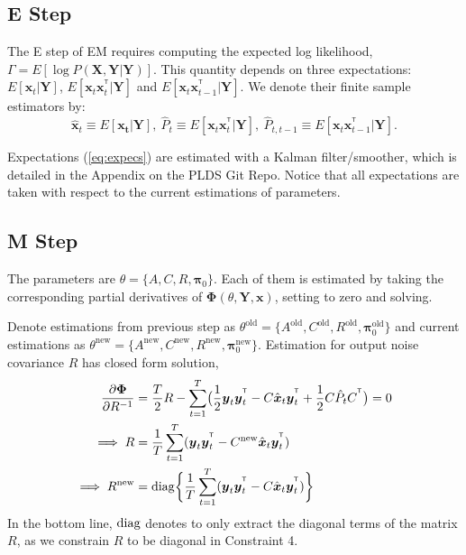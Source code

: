 \documentclass[fleqn,12pt]{article}
\let\oldref\ref
\renewcommand{\ref}[1]{(\oldref{#1})}
\newcommand{\T}{^{\ensuremath{\mathsf{T}}}}           %
\newcommand{\diag}{\operatornamewithlimits{diag}}
\providecommand{\mb}[1]{\boldsymbol{#1}}
\newcommand{\bx}{\mb{x}}
\newcommand{\by}{\mb{y}}
\newcommand{\bX}{\mb{X}}
\newcommand{\bY}{\mb{Y}}
\begin{document}
\subsection{E Step}
The E step of EM requires computing the expected log likelihood, $\Gamma = E[\log P(\bX,\bY|\bY)]$. This quantity depends on three expectations: $E[\bx_t|\bY]$, $E[\bx_t\bx_t^{\T}|\bY]$ and $E[\bx_t\bx_{t-1}^{\T}|\bY]$. We denote their finite sample estimators by:
\begin{equation}\label{eq:expecs}
\hat{\bx}_t \equiv E[\mathbf{x_t}|\bY],\  \hat{P}_t  \equiv E[\bx_t\bx_t^{\T}|\bY],\  \hat{P}_{t,t-1}  \equiv E[\bx_t\bx_{t-1}^{\T}|\bY].
\end{equation}

Expectations \ref{eq:expecs} are estimated with a Kalman filter/smoother, which is detailed in the Appendix on the PLDS Git Repo. Notice that all expectations are taken with respect to the current estimations of parameters.
\subsection{M Step}
The parameters are $\theta =\{A,C,R,\mathbf{\pi}_0\}$. Each of them is estimated by taking the corresponding partial derivatives of $\mathbf{\Phi}(\theta,\bY,\bx)$, setting to zero and solving.

Denote estimations from previous step as $\theta^{\text{old}} =\{A^{\text{old}},C^{\text{old}},R^{\text{old}},\mathbf{\pi}_0^{\text{old}}\}$ and current estimations as $\theta^{\text{new}} =\{A^{\text{new}},C^{\text{new}},R^{\text{new}},\mathbf{\pi}_0^{\text{new}}\}$. Estimation for output noise covariance $R$ has closed form solution,
\begin{equation}\label{eq:updateR}
\begin{aligned}
\frac{\partial \mathbf{\Phi}}{\partial R^{-1}} &= \frac{T}{2}R - \sum\limits_{t=1}^T\bigl(\frac{1}{2}\by_t\by_t^{\T} - C\hat{\bx}_t\by_t^{\T}+\frac{1}{2}C\hat{P}_tC^{\T}\bigr) =0 \\
\implies R &= \frac{1}{T}\sum\limits_{t=1}^{T}(\by_t\by_t^{\T}-C^{\text{new}}\hat{\bx}_t\by_t^{\T})\\
\implies R^{\text{new}} &= \diag \biggl\{\frac{1}{T}\sum\limits_{t=1}^{T}(\by_t\by_t^{\T}-C\hat{\bx}_t\by_t^{\T})\biggr\}
\end{aligned}
\end{equation}
In the bottom line, $\diag$ denotes to only extract the diagonal terms of the matrix $R$, as we constrain $R$ to be diagonal in Constraint 4.
\end{document}
